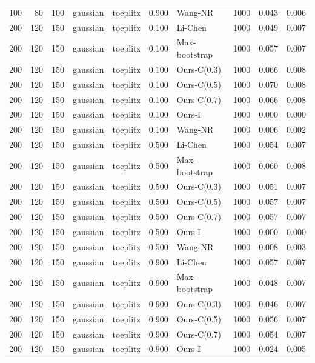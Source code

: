 \begin{tabular}{rrrllrlrrr}
100 & 80 & 100 & gaussian & toeplitz & 0.900 & Wang-NR & 1000 & 0.043 & 0.006 \\
200 & 120 & 150 & gaussian & toeplitz & 0.100 & Li-Chen & 1000 & 0.049 & 0.007 \\
200 & 120 & 150 & gaussian & toeplitz & 0.100 & Max-bootstrap & 1000 & 0.057 & 0.007 \\
200 & 120 & 150 & gaussian & toeplitz & 0.100 & Ours-C(0.3) & 1000 & 0.066 & 0.008 \\
200 & 120 & 150 & gaussian & toeplitz & 0.100 & Ours-C(0.5) & 1000 & 0.070 & 0.008 \\
200 & 120 & 150 & gaussian & toeplitz & 0.100 & Ours-C(0.7) & 1000 & 0.066 & 0.008 \\
200 & 120 & 150 & gaussian & toeplitz & 0.100 & Ours-I & 1000 & 0.000 & 0.000 \\
200 & 120 & 150 & gaussian & toeplitz & 0.100 & Wang-NR & 1000 & 0.006 & 0.002 \\
200 & 120 & 150 & gaussian & toeplitz & 0.500 & Li-Chen & 1000 & 0.054 & 0.007 \\
200 & 120 & 150 & gaussian & toeplitz & 0.500 & Max-bootstrap & 1000 & 0.060 & 0.008 \\
200 & 120 & 150 & gaussian & toeplitz & 0.500 & Ours-C(0.3) & 1000 & 0.051 & 0.007 \\
200 & 120 & 150 & gaussian & toeplitz & 0.500 & Ours-C(0.5) & 1000 & 0.057 & 0.007 \\
200 & 120 & 150 & gaussian & toeplitz & 0.500 & Ours-C(0.7) & 1000 & 0.057 & 0.007 \\
200 & 120 & 150 & gaussian & toeplitz & 0.500 & Ours-I & 1000 & 0.000 & 0.000 \\
200 & 120 & 150 & gaussian & toeplitz & 0.500 & Wang-NR & 1000 & 0.008 & 0.003 \\
200 & 120 & 150 & gaussian & toeplitz & 0.900 & Li-Chen & 1000 & 0.057 & 0.007 \\
200 & 120 & 150 & gaussian & toeplitz & 0.900 & Max-bootstrap & 1000 & 0.048 & 0.007 \\
200 & 120 & 150 & gaussian & toeplitz & 0.900 & Ours-C(0.3) & 1000 & 0.046 & 0.007 \\
200 & 120 & 150 & gaussian & toeplitz & 0.900 & Ours-C(0.5) & 1000 & 0.056 & 0.007 \\
200 & 120 & 150 & gaussian & toeplitz & 0.900 & Ours-C(0.7) & 1000 & 0.054 & 0.007 \\
200 & 120 & 150 & gaussian & toeplitz & 0.900 & Ours-I & 1000 & 0.024 & 0.005 \\

\end{tabular}
